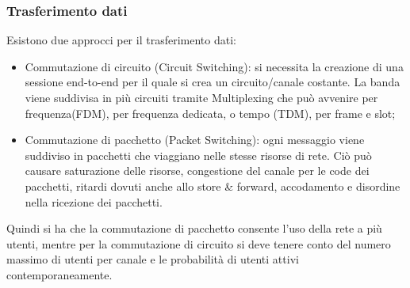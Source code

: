 \documentclass{subfiles}
\begin{document}
\subsubsection{Trasferimento dati}
    Esistono due approcci per il trasferimento dati:
    \begin{itemize}
        \item Commutazione di circuito (Circuit Switching): si necessita la creazione di una sessione end-to-end per il quale si crea un 
        circuito/canale costante. La banda viene suddivisa in più circuiti tramite Multiplexing che può avvenire per frequenza(FDM), 
        per frequenza dedicata, o tempo (TDM), per frame e slot;
        \item Commutazione di pacchetto (Packet Switching): ogni messaggio viene suddiviso in pacchetti che viaggiano nelle stesse 
        risorse di rete. Ciò può causare saturazione delle risorse, congestione del canale per le code dei pacchetti, ritardi dovuti 
        anche allo store \& forward, accodamento e disordine  nella ricezione dei pacchetti. 
    \end{itemize}
    Quindi si ha che la commutazione di pacchetto consente l'uso della rete a più utenti, mentre  per la commutazione di circuito si 
    deve tenere conto del numero massimo di utenti per canale e le probabilità di utenti attivi contemporaneamente.
   
\end{document}
